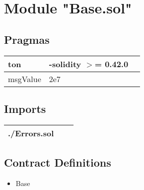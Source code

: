 
\section{Module "Base.sol"}


\subsection{Pragmas}


\noindent\begin{tabular}{|l|l|p{5cm}|}\hline
ton & -solidity $>$= 0.42.0 &\\\hline
msgValue &  2e7 &\\\hline
\end{tabular}


\subsection{Imports}


\noindent\begin{tabular}{|l|l|p{5cm}|}\hline
./Errors.sol &\\\hline
\end{tabular}


\subsection{Contract Definitions}

\begin{itemize}
\item Base
\end{itemize}
